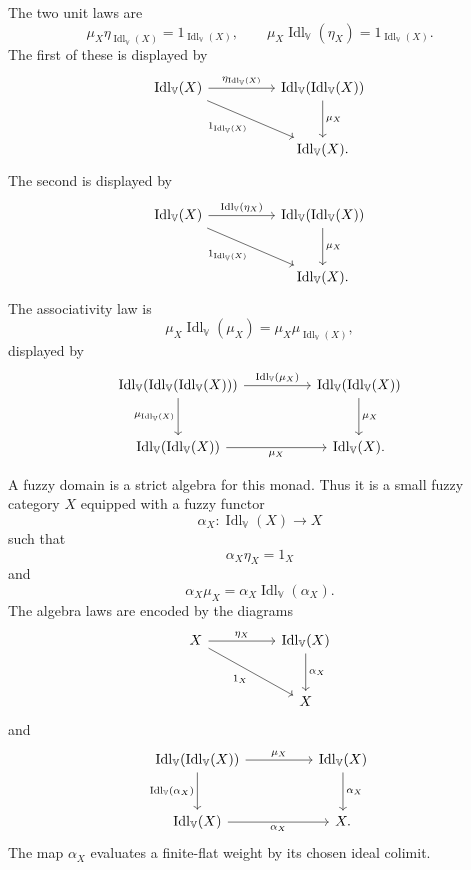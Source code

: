 The two unit laws are
\[
    \mu_X\eta_{\operatorname{Idl}_{\mathbb V}(X)}
    =
    1_{\operatorname{Idl}_{\mathbb V}(X)},
    \qquad
    \mu_X\operatorname{Idl}_{\mathbb V}(\eta_X)
    =
    1_{\operatorname{Idl}_{\mathbb V}(X)}.
\]
The first of these is displayed by
\[
\begin{tikzcd}[column sep=huge,row sep=large]
\operatorname{Idl}_{\mathbb V}(X)
    \ar[r,"\eta_{\operatorname{Idl}_{\mathbb V}(X)}"]
    \ar[dr,"1_{\operatorname{Idl}_{\mathbb V}(X)}"']
&
\operatorname{Idl}_{\mathbb V}(\operatorname{Idl}_{\mathbb V}(X))
    \ar[d,"\mu_X"]
\\
&
\operatorname{Idl}_{\mathbb V}(X).
\end{tikzcd}
\]
The second is displayed by
\[
\begin{tikzcd}[column sep=huge,row sep=large]
\operatorname{Idl}_{\mathbb V}(X)
    \ar[r,"\operatorname{Idl}_{\mathbb V}(\eta_X)"]
    \ar[dr,"1_{\operatorname{Idl}_{\mathbb V}(X)}"']
&
\operatorname{Idl}_{\mathbb V}(\operatorname{Idl}_{\mathbb V}(X))
    \ar[d,"\mu_X"]
\\
&
\operatorname{Idl}_{\mathbb V}(X).
\end{tikzcd}
\]
The associativity law is
\[
    \mu_X\operatorname{Idl}_{\mathbb V}(\mu_X)
    =
    \mu_X\mu_{\operatorname{Idl}_{\mathbb V}(X)},
\]
displayed by
\[
\begin{tikzcd}[column sep=huge,row sep=large]
\operatorname{Idl}_{\mathbb V}
    (\operatorname{Idl}_{\mathbb V}
    (\operatorname{Idl}_{\mathbb V}(X)))
    \ar[r,"\operatorname{Idl}_{\mathbb V}(\mu_X)"]
    \ar[d,"\mu_{\operatorname{Idl}_{\mathbb V}(X)}"']
&
\operatorname{Idl}_{\mathbb V}
    (\operatorname{Idl}_{\mathbb V}(X))
    \ar[d,"\mu_X"]
\\
\operatorname{Idl}_{\mathbb V}
    (\operatorname{Idl}_{\mathbb V}(X))
    \ar[r,"\mu_X"']
&
\operatorname{Idl}_{\mathbb V}(X).
\end{tikzcd}
\]

A fuzzy domain is a strict algebra for this monad. Thus it is a small fuzzy
category \(X\) equipped with a fuzzy functor
\[
    \alpha_X:
    \operatorname{Idl}_{\mathbb V}(X)
    \to
    X
\]
such that
\[
    \alpha_X\eta_X=1_X
\]
and
\[
    \alpha_X\mu_X
    =
    \alpha_X\operatorname{Idl}_{\mathbb V}(\alpha_X).
\]
The algebra laws are encoded by the diagrams
\[
\begin{tikzcd}[column sep=huge,row sep=large]
X
    \ar[r,"\eta_X"]
    \ar[dr,"1_X"']
&
\operatorname{Idl}_{\mathbb V}(X)
    \ar[d,"\alpha_X"]
\\
&
X
\end{tikzcd}
\]
and
\[
\begin{tikzcd}[column sep=huge,row sep=large]
\operatorname{Idl}_{\mathbb V}
    (\operatorname{Idl}_{\mathbb V}(X))
    \ar[r,"\mu_X"]
    \ar[d,"\operatorname{Idl}_{\mathbb V}(\alpha_X)"']
&
\operatorname{Idl}_{\mathbb V}(X)
    \ar[d,"\alpha_X"]
\\
\operatorname{Idl}_{\mathbb V}(X)
    \ar[r,"\alpha_X"']
&
X.
\end{tikzcd}
\]
The map \(\alpha_X\) evaluates a finite-flat weight by its chosen ideal colimit.

